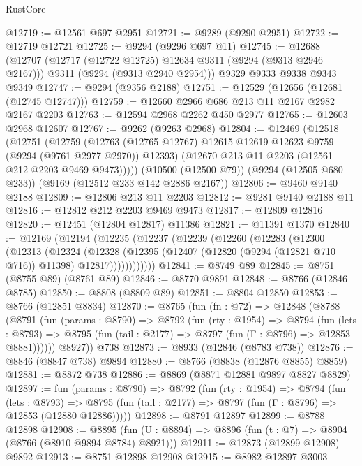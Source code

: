 \begin{lexlean}{RustCore}
\begin{coremodule}
@12719 := @12561 @697 @2951
@12721 := @9289 (@9290 @2951)
@12722 := @12719 @12721
@12725 := @9294 (@9296 @697 @11)
@12745 := @12688
    (@12707
      (@12717 (@12722 @12725) @12634 @9311 (@9294 (@9313 @2946 @2167)))
      @9311
      (@9294 (@9313 @2940 @2954)))
    @9329
    @9333
    @9338
    @9343
    @9349
@12747 := @9294 (@9356 @2188)
@12751 := @12529 (@12656 (@12681 (@12745 @12747)))
@12759 := @12660 @2966 @686 @213 @11 @2167 @2982 @2167 @2203
@12763 := @12594 @2968 @2262 @450 @2977
@12765 := @12603 @2968 @12607
@12767 := @9262 (@9263 @2968)
@12804 := @12469
    (@12518
      (@12751
        (@12759
          (@12763 (@12765 @12767) @12615 @12619 @12623 @9759 (@9294 (@9761 @2977 @2970)) @12393)
          (@12670 @213 @11 @2203 (@12561 @212 @2203 @9469 @9473)))))
    (@10500 (@12500 @79))
    (@9294 (@12505 @680 @233))
    (@9169 (@12512 @233 @142 @2886 @2167))
@12806 := @9460 @9140 @2188
@12809 := @12806 @213 @11 @2203
@12812 := @9281 @9140 @2188 @11
@12816 := @12812 @212 @2203 @9469 @9473
@12817 := @12809 @12816
@12820 := @12451 (@12804 @12817) @11386
@12821 := @11391 @1370
@12840 := @12169
    (@12194
      (@12235
        (@12237
          (@12239
            (@12260
              (@12283
                (@12300
                  (@12313
                    (@12324
                      (@12328
                        (@12395
                          (@12407 (@12820 (@9294 (@12821 @710 @716)) @11398) @12817))))))))))))
@12841 := @8749 @89
@12845 := @8751 (@8755 @89) (@8761 @89)
@12846 := @8770 @9891
@12848 := @8766 (@12846 @8785)
@12850 := @8808 (@8809 @89)
@12851 := @8804 @12850
@12853 := @8766 (@12851 @8834)
@12870 := @8765
    (fun (fn : @72) =>
    @12848
      (@8788
        (@8791
          (fun (params : @8790) =>
          @8792
            (fun (rty : @1954) =>
            @8794
              (fun (lets : @8793) =>
              @8795 (fun (tail : @2177) => @8797 (fun (Γ : @8796) => @12853 @8881))))))
        @8927))
    @738
@12873 := @8933 (@12846 (@8783 @738))
@12876 := @8846 (@8847 @738) @9894
@12880 := @8766 (@8838 (@12876 @8855) @8859)
@12881 := @8872 @738
@12886 := @8869 (@8871 @12881 @9897 @8827 @8829)
@12897 := fun (params : @8790) =>
  @8792
    (fun (rty : @1954) =>
    @8794
      (fun (lets : @8793) =>
      @8795 (fun (tail : @2177) => @8797 (fun (Γ : @8796) => @12853 (@12880 @12886)))))
@12898 := @8791 @12897
@12899 := @8788 @12898
@12908 := @8895 (fun (U : @8894) => @8896 (fun (t : @7) => @8904 (@8766 (@8910 @9894 @8784) @8921)))
@12911 := @12873 (@12899 @12908) @9892
@12913 := @8751 @12898 @12908
@12915 := @8982 @12897 @3003

\end{coremodule}
\end{lexlean}
